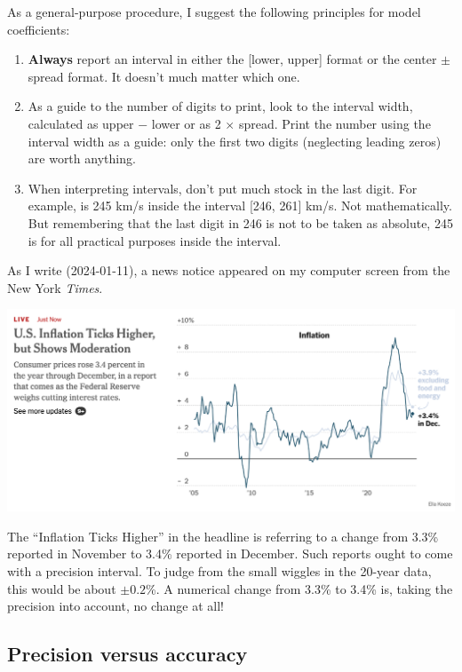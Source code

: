 \documentclass[
  letterpaper,
  DIV=11,
  numbers=noendperiod,
  oneside]{scrartcl}
\providecommand{\tightlist}{%
  \setlength{\itemsep}{0pt}\setlength{\parskip}{0pt}}\usepackage{longtable,booktabs,array}
\begin{document}
\begin{tcolorbox}
As a general-purpose procedure, I suggest the following principles for
model coefficients:

\begin{enumerate}
\def\labelenumi{\arabic{enumi}.}
\tightlist
\item
  \textbf{Always} report an interval in either the {[}lower, upper{]}
  format or the center \(\pm\) spread format. It doesn't much matter
  which one.
\item
  As a guide to the number of digits to print, look to the interval
  width, calculated as upper \(-\) lower or as 2 \(\times\) spread.
  Print the number using the interval width as a guide: only the first
  two digits (neglecting leading zeros) are worth anything.
\item
  When interpreting intervals, don't put much stock in the last digit.
  For example, is 245 km/s inside the interval {[}246, 261{]} km/s. Not
  mathematically. But remembering that the last digit in 246 is not to
  be taken as absolute, 245 is for all practical purposes inside the
  interval.
\end{enumerate}

As I write (2024-01-11), a news notice appeared on my computer screen
from the New York \emph{Times}.

\includegraphics{www/nyt-inflation-2024-01-11.png}

The ``Inflation Ticks Higher'' in the headline is referring to a change
from 3.3\% reported in November to 3.4\% reported in December. Such
reports ought to come with a precision interval. To judge from the small
wiggles in the 20-year data, this would be about \(\pm 0.2\)\%. A
numerical change from 3.3\% to 3.4\% is, taking the precision into
account, no change at all!

\end{tcolorbox}

\subsection{Precision versus accuracy}\label{precision-versus-accuracy}
\end{document}
